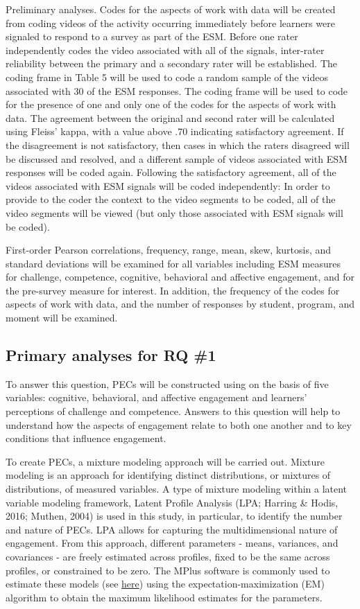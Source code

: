 \documentclass[]{book}
\theoremstyle{definition}
\theoremstyle{definition}
\theoremstyle{definition}
\theoremstyle{remark}
\begin{document}
Preliminary analyses. Codes for the aspects of work with data will be
created from coding videos of the activity occurring immediately before
learners were signaled to respond to a survey as part of the ESM. Before
one rater independently codes the video associated with all of the
signals, inter-rater reliability between the primary and a secondary
rater will be established. The coding frame in Table 5 will be used to
code a random sample of the videos associated with 30 of the ESM
responses. The coding frame will be used to code for the presence of one
and only one of the codes for the aspects of work with data. The
agreement between the original and second rater will be calculated using
Fleiss' kappa, with a value above .70 indicating satisfactory agreement.
If the disagreement is not satisfactory, then cases in which the raters
disagreed will be discussed and resolved, and a different sample of
videos associated with ESM responses will be coded again. Following the
satisfactory agreement, all of the videos associated with ESM signals
will be coded independently: In order to provide to the coder the
context to the video segments to be coded, all of the video segments
will be viewed (but only those associated with ESM signals will be
coded).

First-order Pearson correlations, frequency, range, mean, skew,
kurtosis, and standard deviations will be examined for all variables
including ESM measures for challenge, competence, cognitive, behavioral
and affective engagement, and for the pre-survey measure for interest.
In addition, the frequency of the codes for aspects of work with data,
and the number of responses by student, program, and moment will be
examined.

\subsection{Primary analyses for RQ
\#1}\label{primary-analyses-for-rq-1}

To answer this question, PECs will be constructed using on the basis of
five variables: cognitive, behavioral, and affective engagement and
learners' perceptions of challenge and competence. Answers to this
question will help to understand how the aspects of engagement relate to
both one another and to key conditions that influence engagement.

To create PECs, a mixture modeling approach will be carried out. Mixture
modeling is an approach for identifying distinct distributions, or
mixtures of distributions, of measured variables. A type of mixture
modeling within a latent variable modeling framework, Latent Profile
Analysis (LPA; Harring \& Hodis, 2016; Muthen, 2004) is used in this
study, in particular, to identify the number and nature of PECs. LPA
allows for capturing the multidimensional nature of engagement. From
this approach, different parameters - means, variances, and covariances
- are freely estimated across profiles, fixed to be the same across
profiles, or constrained to be zero. The MPlus software is commonly used
to estimate these models (see
\href{https://www.statmodel.com/examples/mixture.shtml}{here}) using the
expectation-maximization (EM) algorithm to obtain the maximum likelihood
estimates for the parameters.
\end{document}
